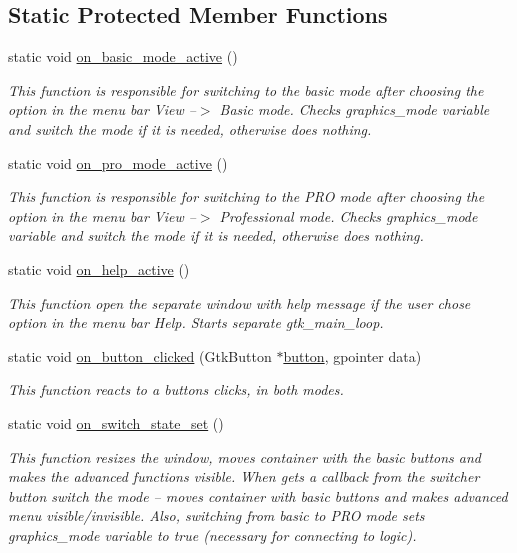 \subsection*{Static Protected Member Functions}
\begin{DoxyCompactItemize}
\item 
static void \mbox{\hyperlink{class_g_u_i_ac8eef0703944714586fff5b345bb4f0a}{on\+\_\+basic\+\_\+mode\+\_\+active}} ()
\begin{DoxyCompactList}\small\item\em This function is responsible for switching to the basic mode after choosing the option in the menu bar View –$>$ Basic mode. Checks graphics\+\_\+mode variable and switch the mode if it is needed, otherwise does nothing. \end{DoxyCompactList}\item 
static void \mbox{\hyperlink{class_g_u_i_a9720b1f8f68eb084dd81d499c5700dfe}{on\+\_\+pro\+\_\+mode\+\_\+active}} ()
\begin{DoxyCompactList}\small\item\em This function is responsible for switching to the P\+RO mode after choosing the option in the menu bar View –$>$ Professional mode. Checks graphics\+\_\+mode variable and switch the mode if it is needed, otherwise does nothing. \end{DoxyCompactList}\item 
static void \mbox{\hyperlink{class_g_u_i_a9d0280f8709063c1064f942c1eea7608}{on\+\_\+help\+\_\+active}} ()
\begin{DoxyCompactList}\small\item\em This function open the separate window with help message if the user chose option in the menu bar Help. Starts separate gtk\+\_\+main\+\_\+loop. \end{DoxyCompactList}\item 
static void \mbox{\hyperlink{class_g_u_i_ab304a773588b83f791473af089954465}{on\+\_\+button\+\_\+clicked}} (Gtk\+Button $\ast$\mbox{\hyperlink{class_g_u_i_af57253dc8e8f22f62675d9e05972f189}{button}}, gpointer data)
\begin{DoxyCompactList}\small\item\em This function reacts to a buttons clicks, in both modes. \end{DoxyCompactList}\item 
static void \mbox{\hyperlink{class_g_u_i_a89703c7bb0f5b09a4605b70e6636e509}{on\+\_\+switch\+\_\+state\+\_\+set}} ()
\begin{DoxyCompactList}\small\item\em This function resizes the window, moves container with the basic buttons and makes the advanced functions visible. When gets a callback from the switcher button switch the mode – moves container with basic buttons and makes advanced menu visible/invisible. Also, switching from basic to P\+RO mode sets graphics\+\_\+mode variable to true (necessary for connecting to logic). \end{DoxyCompactList}\end{DoxyCompactItemize}
